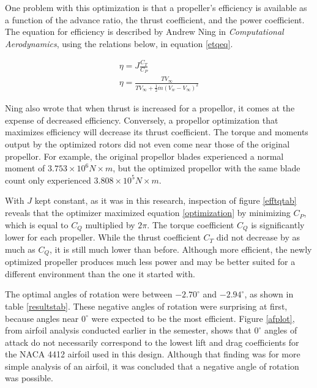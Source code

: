 \documentclass[journal ]{new-aiaa}
\begin{document}
One problem with this optimization is that a propeller's efficiency is available as a function of the advance ratio, the thrust coefficient, and the power coefficient. The equation for efficiency is described by Andrew Ning in \emph{Computational Aerodynamics},\cite{ComAer} using the relations below, in equation \ref{etqeq}.

\begin{equation}
	\begin{aligned}
	\label{etqeq}
	\eta = J \frac{C_{T}}{C_{P}} \\
	\eta = \frac{T V_{\infty}}{T V_{\infty} + \frac{1}{2} \dot{m} (V_{w} - V_{\infty})^{2}}
	\end{aligned}
\end{equation}

Ning also wrote that when thrust is increased for a propellor, it comes at the expense of decreased efficiency.\cite{ComAer} Conversely, a propellor optimization that maximizes efficiency will decrease its thrust coefficient. The torque and moments output by the optimized rotors did not even come near those of the original propellor. For example, the original propellor blades experienced a normal moment of $3.753 \times 10^{6}N \times m$, but the optimized propellor with the same blade count only experienced $3.808 \times 10^{5} N \times m$.

With $J$ kept constant, as it was in this research, inspection of figure \ref{efftqtab} reveals that the optimizer maximized equation \ref{optimization} by minimizing $C_{P}$, which is equal to $C_{Q}$ multiplied by $2 \pi$. The torque coefficient $C_{Q}$ is significantly lower for each propeller. While the thrust coefficient $C_{T}$ did not decrease by as much as $C_{Q}$, it is still much lower than before. Although more efficient, the newly optimized propeller produces much less power and may be better suited for a different environment than the one it started with.























The optimal angles of rotation were between $-2.70^{\circ}$ and $-2.94^{\circ}$, as shown in table \ref{resultstab}. These negative angles of rotation were surprising at first, because angles near $0^{\circ}$ were expected to be the most efficient. Figure \ref{afplot}, from airfoil analysis conducted earlier in the semester, shows that $0^{\circ}$ angles of attack do not necessarily correspond to the lowest lift and drag coefficients for the NACA 4412 airfoil used in this design. Although that finding was for more simple analysis of an airfoil, it was concluded that a negative angle of rotation was possible.
\end{document}
